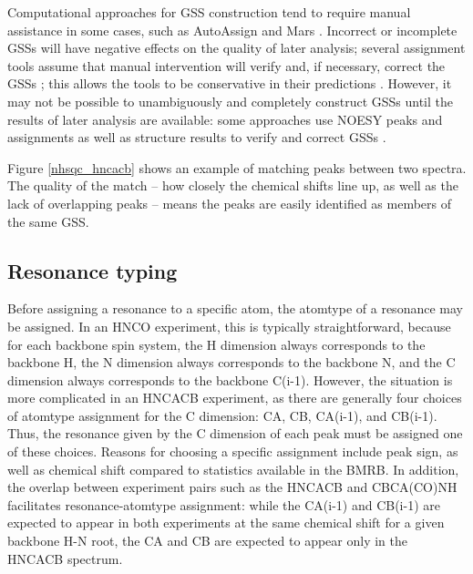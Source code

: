 Computational approaches for GSS construction tend to require manual 
assistance in some cases, such as AutoAssign and Mars 
\cite{autoassign1997, mars}.  Incorrect or 
incomplete GSSs will have negative effects on the quality of later 
analysis; several assignment tools assume that manual intervention will 
verify and, if necessary, correct the GSSs \cite{williamson2009automated}; 
this allows the tools to be conservative in their 
predictions \cite{autoassign1997}.  However, it may not be 
possible to unambiguously and completely construct GSSs until the results 
of later analysis are available: some approaches use NOESY peaks and 
assignments as well as structure results to verify and correct GSSs 
\cite{autoassign1997}.

Figure \ref{nhsqc_hncacb} shows an example of matching peaks between two
spectra.  The quality of the match -- how closely the chemical shifts line up,
as well as the lack of overlapping peaks -- means the peaks are easily
identified as members of the same GSS.

\subsection*{Resonance typing}
Before assigning a resonance to a specific 
atom, the atomtype of a resonance may be assigned.  In an HNCO experiment, 
this is typically straightforward, because for each backbone spin system, 
the H dimension always corresponds to the backbone H, the N dimension always 
corresponds to the backbone N, and the C dimension always corresponds to the 
backbone C(i-1).  However, the situation is more complicated in an HNCACB 
experiment, as there are generally four choices of atomtype assignment for 
the C dimension:  CA, CB, CA(i-1), and CB(i-1).  Thus, the resonance given 
by the C dimension of each peak must be assigned one of these choices.  
Reasons for choosing a specific assignment include peak sign, as well as 
chemical shift compared to statistics available in the BMRB.  In addition, 
the overlap between experiment pairs such as the HNCACB and CBCA(CO)NH 
facilitates resonance-atomtype assignment: while the CA(i-1) and CB(i-1) 
are expected to appear in both experiments at the same chemical shift for 
a given backbone H-N root, the CA and CB are expected to appear only in the 
HNCACB spectrum.

